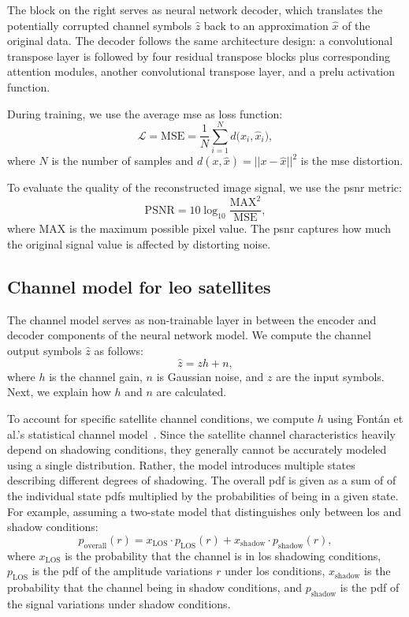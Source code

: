 \documentclass[conference]{IEEEtran}
\begin{document}
The block on the right serves as neural network decoder, which translates the potentially corrupted channel symbols $\hat{z}$ back to an approximation $\hat{x}$ of the original data.
The decoder follows the same architecture design: a convolutional transpose layer is followed by four residual transpose blocks plus corresponding attention modules,  another convolutional transpose layer, and a \ac{prelu} activation function.

During training, we use the average \ac{mse} as loss function:
%
\begin{equation}
  \mathcal{L} = \mathrm{MSE} = \frac{1}{N} \sum_{i=1}^{N} d \bigl(x_i, \hat{x}_i\bigr),
\end{equation}
where $N$ is the number of samples and $d(x, \hat{x}) = || x - \hat{x} ||^2$ is the \ac{mse} distortion.

To evaluate the quality of the reconstructed image signal, we use the \ac{psnr} metric:
%
\begin{equation}
  \mathrm{PSNR} = 10 \log_{10}\frac{\mathrm{MAX}^2}{\mathrm{MSE}},
\end{equation}
%
where $\mathrm{MAX}$ is the maximum possible pixel value.
The \ac{psnr} captures how much the original signal value is affected by distorting noise.


\subsection{Channel model for \ac{leo} satellites}
\label{sub:channel_model}

The channel model serves as non-trainable layer in between the encoder and decoder components of the neural network model.
We compute the channel output symbols $\hat{z}$ as follows:
\begin{equation}
  \hat{z} = zh + n,
\end{equation}
where $h$ is the channel gain, $n$ is Gaussian noise, and $z$ are the input symbols.
Next, we explain how $h$ and $n$ are calculated.

To account for specific satellite channel conditions, we compute $h$ using Fontán et al.'s statistical channel model~\cite{966585}. 
Since the satellite channel characteristics heavily depend on shadowing conditions, 
they generally cannot be accurately modeled using a single distribution.
Rather, the model introduces multiple states describing different degrees of shadowing. 
The overall \ac{pdf} is given as a sum of of the individual state \acp{pdf} multiplied by the probabilities of being in a given state.
For example, assuming a two-state model that distinguishes only between \ac{los} and shadow conditions: 
%
\begin{equation}
p_{\mathrm{overall}}(r) = x_{\mathrm{LOS}} \cdot p_{\mathrm{LOS}}(r)
  + x_{\mathrm{shadow}} \cdot p_{\mathrm{shadow}}(r),
\end{equation}
%
where $x_{\mathrm{LOS}}$ is the probability that the channel is in \ac{los} shadowing conditions, $p_{\mathrm{LOS}}$ is the \ac{pdf} of the amplitude variations $r$ under \ac{los} conditions, $x_{\mathrm{shadow}}$ is the probability that the channel being in shadow conditions, and $p_{\mathrm{shadow}}$ is the \ac{pdf} of the signal variations under shadow conditions.
\end{document}
